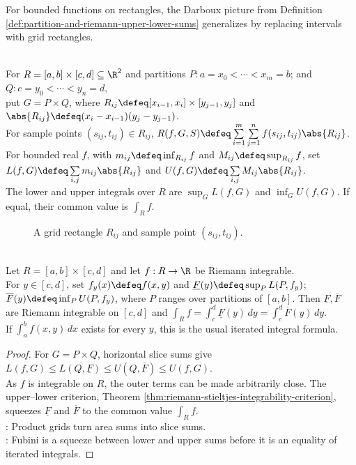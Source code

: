 For bounded functions on rectangles, the Darboux picture from Definition \ref{def:partition-and-riemann-upper-lower-sums} generalizes by replacing intervals with grid rectangles.

\begin{definition} \label{def:rectangular-grid-riemann-sum} \\
For $R=[a,b]\times[c,d]\subseteq\R^2$ and partitions $P:a=x_0<\cdots<x_m=b$; and $Q:c=y_0<\cdots<y_n=d$,\\
put $G=P\times Q$, where $R_{ij}\defeq[x_{i-1},x_i]\times[y_{j-1},y_j]$ and $\abs{R_{ij}}\defeq (x_i-x_{i-1})(y_j-y_{j-1})$.\\
For sample points $(s_{ij},t_{ij})\in R_{ij}$, $R(f,G,S)\defeq\sum\limits_{i=1}^{m}\sum\limits_{j=1}^{n} f(s_{ij},t_{ij})\abs{R_{ij}}$. For bounded real $f$, with $m_{ij}\defeq\inf_{R_{ij}}f$ and $M_{ij}\defeq\sup_{R_{ij}}f$, set $L(f,G)\defeq\sum\limits_{i,j}m_{ij}\abs{R_{ij}}$ and $U(f,G)\defeq\sum\limits_{i,j}M_{ij}\abs{R_{ij}}$.\\
The lower and upper integrals over $R$ are $\sup_G L(f,G)$ and $\inf_G U(f,G)$. If equal, their common value is $\int_R f$.
\end{definition}

\begin{figure}[H]
  \centering
  
  \caption{A grid rectangle $R_{ij}$ and sample point $(s_{ij},t_{ij})$.}
  \label{fig:riemann-grid-sample-rectangle}
\end{figure}

\begin{theorem} \label{thm:fubini-riemann-rectangle-slices} \\
Let $R=[a,b]\times[c,d]$ and let $f:R\to\R$ be Riemann integrable.\\
For $y\in[c,d]$, set $f_y(x)\defeq f(x,y)$ and $\underline{F}(y)\defeq \sup_P L(P,f_y)$; $\overline{F}(y)\defeq \inf_P U(P,f_y)$, where $P$ ranges over partitions of $[a,b]$. Then $\underline{F},\overline{F}$ are Riemann integrable on $[c,d]$ and $\int_R f=\int_c^d \underline{F}(y)\,dy=\int_c^d \overline{F}(y)\,dy$.\\
If $\int_a^b f(x,y)\,dx$ exists for every $y$, this is the usual iterated integral formula.
\begin{proof}
For $G=P\times Q$, horizontal slice sums give $L(f,G)\leq L(Q,\underline{F})\leq U(Q,\overline{F})\leq U(f,G)$.\\
As $f$ is integrable on $R$, the outer terms can be made arbitrarily close. The upper--lower criterion, Theorem \ref{thm:riemann-stieltjes-integrability-criterion}, squeezes $\underline{F}$ and $\overline{F}$ to the common value $\int_R f$.\\
: Product grids turn area sums into slice sums.\\
: Fubini is a squeeze between lower and upper sums before it is an equality of iterated integrals.
\end{proof}
\end{theorem}

